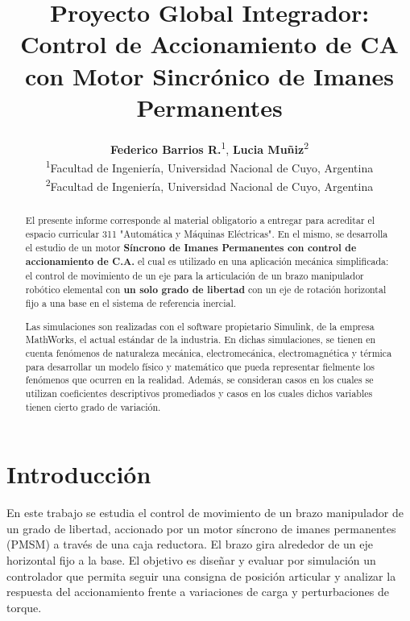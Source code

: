 \documentclass[blue,fullpaper]{ludusofficial}  %
\title{Proyecto Global Integrador: Control de Accionamiento de CA con Motor Sincrónico de Imanes Permanentes}
\author{%
    \textbf{Federico Barrios R.}\textsuperscript{1}, \textbf{Lucia Muñiz}\textsuperscript{2}\\[0.2cm]
    \mdseries\small\textsuperscript{1}Facultad de Ingeniería, Universidad Nacional de Cuyo, Argentina\\
    \small\textsuperscript{2}Facultad de Ingeniería, Universidad Nacional de Cuyo, Argentina \\
}
\begin{document}
\begin{abstract}
El presente informe corresponde al material obligatorio a entregar para acreditar el espacio curricular 311 "Automática y Máquinas Eléctricas". En el mismo, se desarrolla el estudio de un motor \textbf{Síncrono de Imanes Permanentes con control de accionamiento de C.A.} el cual es utilizado en una aplicación mecánica simplificada: el control de movimiento de un eje para la articulación de un brazo manipulador robótico elemental con \textbf{un solo grado de libertad} con un eje de rotación horizontal fijo a una base en el sistema de referencia inercial.

Las simulaciones son realizadas con el software propietario Simulink, de la empresa MathWorks, el actual estándar de la industria. En dichas simulaciones, se tienen en cuenta fenómenos de naturaleza mecánica, electromecánica, electromagnética y térmica para desarrollar un modelo físico y matemático que pueda representar fielmente los fenómenos que ocurren en la realidad. Además, se consideran casos en los cuales se utilizan coeficientes descriptivos promediados y casos en los cuales dichos variables tienen cierto grado de variación.

\end{abstract}


\maketitle

\onecolumn
\tableofcontents
\clearpage

\clearpage
\section{Introducción}

En este trabajo se estudia el control de movimiento de un brazo manipulador de un grado de libertad, accionado por un motor síncrono de imanes permanentes (PMSM) a través de una caja reductora. El brazo gira alrededor de un eje horizontal fijo a la base. El objetivo es diseñar y evaluar por simulación un controlador que permita seguir una consigna de posición articular y analizar la respuesta del accionamiento frente a variaciones de carga y perturbaciones de torque.
\end{document}
